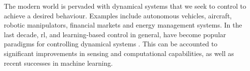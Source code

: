\documentclass{mimosis-class/mimosis}
\numberwithin{equation}{chapter}
\newcommand{\modeInd}{\ensuremath{k}}
\newcommand{\testInd}{\ensuremath{*}}
\newcommand{\state}{\ensuremath{\mathbf{x}}}
\newcommand{\control}{\ensuremath{\mathbf{u}}}
\newcommand{\modeVar}{\ensuremath{\alpha}}
\newcommand{\singleTest}[1]{\ensuremath{#1_{\testInd}}}
\newcommand{\testInput}{\ensuremath{\singleTest{\state}}}
\newcommand{\Jac}{\ensuremath{\mathbf{J}}}
\newcommand{\muJac}{\ensuremath{\mu_{\Jac}}}
\newcommand{\covJac}{\ensuremath{\Sigma_{\Jac}}}
\begin{document}
\newcommand{\manifoldInducingInput}{\ensuremath{\bm\xi}}
\newcommand{\manifoldInducingOutput}{\ensuremath{\manifoldFunction(\manifoldInducingInput)}}
\newcommand{\manifoldInducingVariational}{\ensuremath{q(\mathbf{u})}}
\newcommand{\manifoldInducingOutputMean}{\ensuremath{\mathbf{m}}}
\newcommand{\manifoldInducingOutputCov}{\ensuremath{\mathbf{S}}}
\newcommand{\manifoldMeanFunc}{\ensuremath{\mu}}


\renewcommand{\muJac}{\ensuremath{\bm\mu_{\mathbf{J}}}}
\renewcommand{\covJac}{\ensuremath{\bm\Sigma_{\mathbf{J}}}}
\renewcommand{\testInput}{\ensuremath{\mathbf{x}_*}}

\newcommand{\stateDiff}{\ensuremath{\Delta \state}}

\renewcommand{\stateCostMatrix}{\ensuremath{\mathbf{Q}}}
\renewcommand{\controlCostMatrix}{\ensuremath{\mathbf{R}}}
\renewcommand{\terminalStateCostMatrix}{\ensuremath{\mathbf{H}}}
\renewcommand{\approxExpectedCost}{\ensuremath{J(\stateTraj, \controlTraj)}}

\renewcommand{\terminalState}{\ensuremath{\state_{\TimeInd}}}

\newcommand{\stateMean}{\ensuremath{\bm\mu_{\state_\timeInd}}}
\newcommand{\stateCov}{\ensuremath{\bm\Sigma_{\state_\timeInd}}}
\newcommand{\terminalStateMean}{\ensuremath{\bm\mu_{\state_\TimeInd}}}
\newcommand{\terminalStateCov}{\ensuremath{\bm\Sigma_{\state_\TimeInd}}}
\newcommand{\controlMean}{\ensuremath{\bm\mu_{\control_\timeInd}}}
\newcommand{\controlCov}{\ensuremath{\bm\Sigma_{\control_\timeInd}}}
\newcommand{\stateDiff}{\ensuremath{\Delta \state}}
\newcommand{\stateDiffMean}{\ensuremath{\bm\mu_{\stateDiff_\timeInd}}}
\newcommand{\stateDiffCov}{\ensuremath{\bm\Sigma_{\stateDiff_\timeInd}}}

\renewcommand{\transitionDistK}{\ensuremath{p(\state_{\timeInd+1} \mid \state_\timeInd, \control_\timeInd, \modeVar_{\timeInd}=\modeInd)}}
The modern world is pervaded with dynamical systems that we seek to control to achieve a desired behaviour.
Examples include autonomous vehicles, aircraft, robotic manipulators, financial markets and energy management systems.
In the last decade, \acrfull{rl}, and learning-based
control in general, have become
popular paradigms for controlling dynamical systems \citep{hewingLearningBased2020,sutton2018reinforcement}.
This can be accounted to significant improvements in sensing and computational capabilities, as well as
recent successes in machine learning.
\end{document}
